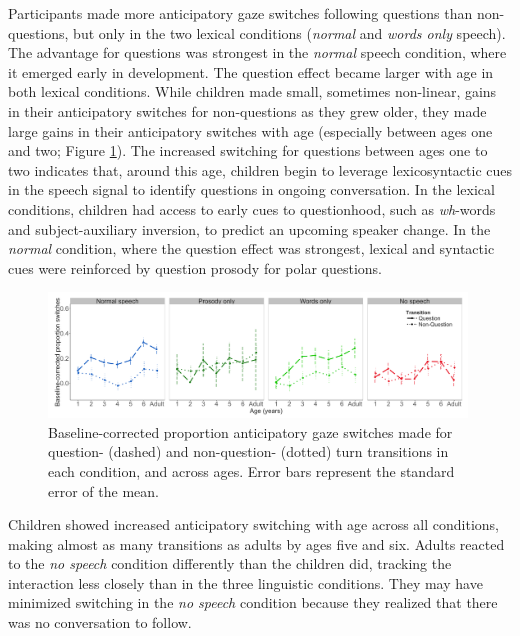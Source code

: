\documentclass[authoryear, 12pt]{elsarticle}
\begin{document}
Participants made more anticipatory gaze switches following questions than non-questions, but only in the two lexical conditions (\textit{normal} and \textit{words only} speech). The advantage for questions was strongest in the \textit{normal} speech condition, where it emerged early in development. The question effect became larger with age in both lexical conditions. While children made small, sometimes non-linear, gains in their anticipatory switches for non-questions as they grew older, they made large gains in their anticipatory switches with age (especially between ages one and two; Figure \ref{fig:questionsEN}). The increased switching for questions between ages one to two indicates that, around this age, children begin to leverage lexicosyntactic cues in the speech signal to identify questions in ongoing conversation. In the lexical conditions, children had access to early cues to questionhood, such as \textit{wh}-words and subject-auxiliary inversion, to predict an upcoming speaker change. In the \textit{normal} condition, where the question effect was strongest, lexical and syntactic cues were reinforced by question prosody for polar questions.

\begin{figure}[t]
\begin{center}
\includegraphics[width=0.99\textwidth]{figures/FIG-QvsNQ-EN.png}
\end{center}
\caption{Baseline-corrected proportion anticipatory gaze switches made for question- (dashed) and non-question- (dotted) turn transitions in each condition, and across ages. Error bars represent the standard error of the mean.} 
\label{fig:questionsEN}
\end{figure}

Children showed increased anticipatory switching with age across all conditions, making almost as many transitions as adults by ages five and six. Adults reacted to the \textit{no speech} condition differently than the children did, tracking the interaction less closely than in the three linguistic conditions. They may have minimized switching in the \textit{no speech} condition because they realized that there was no conversation to follow.
\end{document}
